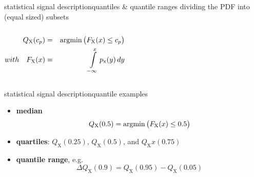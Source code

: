 		\begin{frame}{statistical signal description}{quantiles \& quantile ranges}
			dividing the PDF into (equal sized) subsets
            \vspace{-3mm}
            \begin{columns}
            \begin{footnotesize}
			\begin{eqnarray*}
				Q_\mathrm{X}(c_p) &=& \operatorname*{argmin}\big (F_\mathrm{X}(x) \leq c_p\big)\\
                with\quad F_\mathrm{X}(x) &=& {\int\limits_{-\infty}^{x}{p_\mathrm{x}(y)\, dy}}
			\end{eqnarray*}
            \end{footnotesize}
            \vspace{-9mm}
            \end{columns}
        \end{frame}
		
        \begin{frame}{statistical signal description}{quantile examples}
			\begin{itemize}
				\item	\textbf{median}
						\begin{equation*}\label{eq:median}
							Q_\mathrm{X}(0.5) = \operatorname*{argmin}\big (F_\mathrm{X}(x) \leq 0.5\big)
						\end{equation*}
				\bigskip
				\item	\textbf{quartiles}: $Q_\mathrm{X}(0.25),\, Q_\mathrm{X}(0.5)$, and $Q_\mathrm{X}x(0.75)$
				\bigskip
                \item	\textbf{quantile range}, e.g.
						\begin{equation*}
							\Delta Q_\mathrm{X}(0.9) = Q_\mathrm{X}(0.95)-Q_\mathrm{X}(0.05)
						\end{equation*}
			\end{itemize}
        \end{frame}
        
